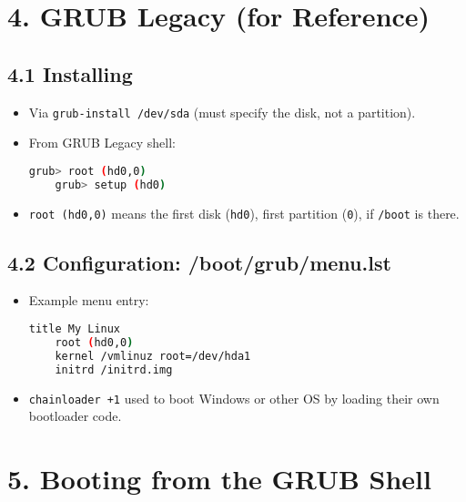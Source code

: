 \documentclass[12pt,a4paper]{report}
\begin{document}
\section*{4. GRUB Legacy (for Reference)}

\subsection*{4.1 Installing}
\begin{itemize}
    \item Via \texttt{grub-install /dev/sda} (must specify the disk, not a partition).  
    \item From GRUB Legacy shell:  
    \begin{lstlisting}[language=bash]
    grub> root (hd0,0)
    grub> setup (hd0)
    \end{lstlisting}
    
    \item \texttt{root (hd0,0)} means the first disk (\texttt{hd0}), first partition (\texttt{0}), if \texttt{/boot} is there.
\end{itemize}

\subsection*{4.2 Configuration: /boot/grub/menu.lst}
\begin{itemize}
    \item Example menu entry:
    \begin{lstlisting}[language=bash]
    title My Linux
    root (hd0,0)
    kernel /vmlinuz root=/dev/hda1
    initrd /initrd.img
    \end{lstlisting}
    
    \item \texttt{chainloader +1} used to boot Windows or other OS by loading their own bootloader code.
\end{itemize}


\section*{5. Booting from the GRUB Shell}
\end{document}

